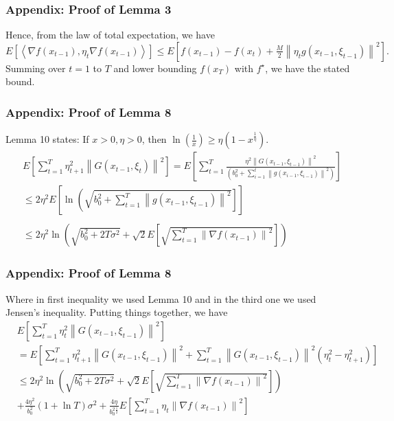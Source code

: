 \documentclass{beamer}
\begin{document}
\begin{frame}
\frametitle{Appendix: Proof of Lemma 3}
Hence, from the law of total expectation, we have
$
{E}\left[\left\langle\nabla f\left({x}_{t-1}\right), {\eta}_t \nabla f\left({x}_{t-1}\right)\right\rangle\right] \leq {E}\left[f\left({x}_{t-1}\right)-f\left({x}_{t}\right)+\frac{M}{2}\left\|{\eta}_t {g}\left({x}_{t-1}, \xi_{t-1}\right)\right\|^2\right] .
$
Summing over $t=1$ to $T$ and lower bounding $f\left({x}_{T}\right)$ with $f^{\star}$, we have the stated bound.
\end{frame}

\begin{frame}
\frametitle{Appendix: Proof of Lemma 8}
Lemma 10 states: If $x>0, \eta>0$, then $\ln (\frac{1}{x}) \geq \eta\left(1-x^{\frac{1}{\eta}}\right)$.
$$
\begin{aligned}
& {E}\left[\sum_{t=1}^T \eta_{t+1}^2\left\|{G}\left({x}_{t-1}, \xi_t\right)\right\|^2\right]={E}\left[\sum_{t=1}^T \frac{\eta^2\left\|{G}\left({x}_{t-1}, \xi_{t-1}\right)\right\|^2}{\left(b_0^2 +\sum_{i=1}^t\left\|{g}\left({x}_{i-1}, \xi_{i-1}\right)\right\|^2\right)}\right] \\
& \leq 2 \eta^2 {E}\left[\ln \left(\sqrt{b_0^2 +\sum_{t=1}^T\left\|{g}\left({x}_{t-1}, \xi_{t-1}\right)\right\|^2}\right]\right] \\
& \\
& \leq 2 \eta^2 \ln \left(\sqrt{b_0^2 +2 T \sigma^2}+\sqrt{2} {E}\left[\sqrt{\sum_{t=1}^T\left\|\nabla f\left({x}_{t-1}\right)\right\|^2}\right]\right)
\end{aligned}
$$
\end{frame}

\begin{frame}
\frametitle{Appendix: Proof of Lemma 8}
Where in first inequality we used Lemma 10 and in the third one we used Jensen's inequality.
Putting things together, we have
$$
\begin{aligned}
& {E}\left[\sum_{t=1}^T \eta_t^2\left\|{G}\left({x}_{t-1}, \xi_{t-1}\right)\right\|^2\right]\\&={E}\left[\sum_{t=1}^T \eta_{t+1}^2\left\|{G}\left({x}_{t-1}, \xi_{t-1}\right)\right\|^2+\sum_{t=1}^T\left\|{G}\left({x}_{t-1}, \xi_{t-1}\right)\right\|^2\left(\eta_t^2-\eta_{t+1}^2\right)\right] \\
& \leq 2 \eta^2 \ln \left(\sqrt{b_0^2 +2 T \sigma^2}+\sqrt{2} {E}\left[\sqrt{\sum_{t=1}^T\left\|\nabla f\left({x}_{t-1}\right)\right\|^2}\right]\right)\\&+\frac{4 \eta^2}{b_0^2 }(1+\ln T) \sigma^2+\frac{4 \eta}{b_0^2 ^{\frac{1}{2}}} {E}\left[\sum_{t=1}^T \eta_t\left\|\nabla f\left({x}_{t-1}\right)\right\|^2\right]
\end{aligned}
$$
\end{frame}
\end{document}
